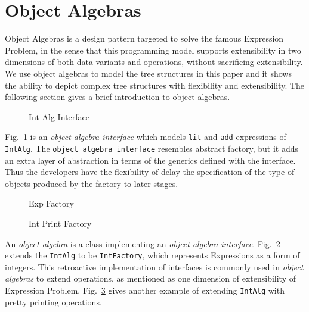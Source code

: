 \section{Object Algebras}\label{subsec:ObjectAlgebras}

Object Algebras is a design pattern targeted to solve the famous Expression Problem, in the sense that this programming model supports extensibility in two dimensions of both data variants and operations, without sacrificing extensibility. We use object algebras to model the tree structures in this paper and it shows the ability to depict complex tree structures with flexibility and extensibility. The following section gives a brief introduction to object algebras.

\begin{figure}[t]
\nocaptionrule
\caption{Int Alg Interface}
\label{int_alg_interface}
\end{figure}

Fig.~\ref{int_alg_interface} is an \emph{object algebra interface} which models \lstinline{lit} and \lstinline{add} expressions of \lstinline{IntAlg}. The \lstinline{object algebra interface} resembles abstract factory, but it adds an extra layer of abstraction in terms of the generics defined with the interface. Thus the developers have the flexibility of delay the specification of the type of objects produced by the factory to later stages.

\begin{figure}[t]
\nocaptionrule
\caption{Exp Factory}
\label{exp_factory}
\end{figure}

\begin{figure}[t]
\nocaptionrule
\caption{Int Print Factory}
\label{int_print_factory}
\end{figure}

An \emph{object algebra} is a class implementing an \emph{object algebra interface}. Fig.~\ref{exp_factory} extends the \lstinline{IntAlg} to be \lstinline{IntFactory}, which represents Expressions as a form of integers. This retroactive implementation of interfaces is commonly used in \emph{object algebras} to extend operations, as mentioned as one dimension of extensibility of Expression Problem. Fig.~\ref{int_print_factory} gives another example of extending \lstinline{IntAlg} with pretty printing operations.

